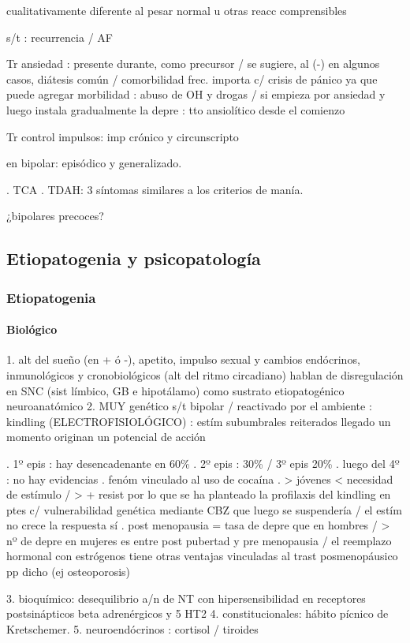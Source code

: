 cualitativamente diferente al pesar normal u otras reacc comprensibles

s/t : recurrencia / AF

Tr ansiedad : presente durante, como precursor / se sugiere, al (-) en algunos casos, diátesis común / comorbilidad frec. importa c/ crisis de pánico ya que puede agregar morbilidad : abuso de OH y drogas / si empieza por ansiedad y luego instala gradualmente la depre : tto ansiolítico desde el comienzo

Tr control impulsos: imp crónico y circunscripto

en bipolar: episódico y generalizado.

. TCA
. TDAH: 3 síntomas similares a los criterios de  manía.

¿bipolares precoces?

\subsection*{Etiopatogenia y psicopatología}
\subsubsection*{Etiopatogenia}
\paragraph{Biológico}

1. alt del sueño (en + ó -), apetito, impulso sexual y cambios endócrinos, inmunológicos y cronobiológicos (alt del ritmo circadiano) hablan de disregulación en SNC (sist límbico, GB e hipotálamo) como sustrato etiopatogénico neuroanatómico
2. MUY genético s/t bipolar / reactivado por el ambiente : kindling (ELECTROFISIOLÓGICO) : estím subumbrales reiterados llegado un momento originan un potencial de acción

. 1º epis : hay desencadenante en 60\%
. 2º epis : 30\% / 3º epis 20\%
. luego del 4º : no hay evidencias
. fenóm vinculado al uso de cocaína
. > jóvenes < necesidad de estímulo / > + resist por lo que se ha planteado la profilaxis del kindling en ptes c/ vulnerabilidad genética mediante CBZ que luego se suspendería / el estím no crece la respuesta sí
. post menopausia = tasa de depre que en hombres / > nº de depre en mujeres es entre post pubertad y pre menopausia / el reemplazo hormonal con estrógenos tiene otras ventajas vinculadas al trast posmenopáusico pp dicho (ej osteoporosis)

3. bioquímico: desequilibrio a/n de NT con hipersensibilidad en receptores postsinápticos beta adrenérgicos y 5 HT2
4. constitucionales: hábito pícnico de Kretschemer.
5. neuroendócrinos : cortisol / tiroides

